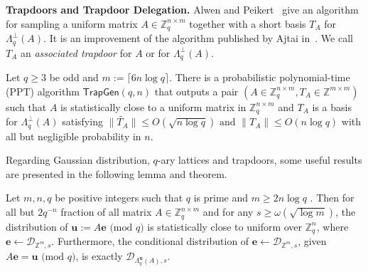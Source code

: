 \documentclass[runningheads]{llncs}
\def\ZZ{\mathbb{Z}}
\def\cal{\mathcal}
\def\bf{\mathbf}
\def\TrapGen{\mathsf{TrapGen}}
\def\L{\Lambda}
\def\Lp{\Lambda^{\perp}}
\begin{document}
\noindent \textbf{Trapdoors and Trapdoor Delegation.}	
Alwen and Peikert~\cite{AP09} give an algorithm for sampling 
a uniform matrix $A\in\ZZ_q^{n\times m}$ together with a  short basis $T_A$ for $\Lp_q(A)$.
It is an improvement of the algorithm published by Ajtai in~\cite{Ajtai99}.
We call $T_A$ an  \textit{associated trapdoor} for $A$ or for $\Lp_q(A)$. 
	\begin{theorem}[\cite{AP09}]\label{thm:TrapGen}
		Let $q\geq 3$ be odd and $m:=\lceil 6n\log q\rceil$. There is a probabilistic polynomial-time (PPT) algorithm $\TrapGen(q,n)$ that outputs a pair $(A\in\ZZ_q^{n\times m},T_A \in\ZZ^{m\times m})$ such that $A$ is statistically close to a uniform matrix in $\ZZ_q^{n\times m}$ and $T_A$ is a basis for $\Lp_q(A)$ satisfying
		$\|\widetilde{T_A}\|\leq O(\sqrt{n\log q})\text{ and }\|T_A\|\leq O(n\log q)$
		with all but negligible probability in $n$.
	\end{theorem}
\noindent
Regarding Gaussian distribution, $q$-ary lattices and trapdoors, 
some useful results are presented in  the following lemma and theorem. 
	\begin{lemma} \label{uniform}
	 Let $m, n, q$ be positive integers such that $q$ is prime and $m \geq 2n \log q$ . Then for all but $2q^{-n}$ fraction of all matrix $A\in \ZZ_q^{n \times m}$ and for any $s\geq \omega(\sqrt{\log m})$, the distribution of $\bf{u}:=A\bf{e} \text{ (mod } q)$ is statistically close to uniform over $\ZZ_q^n$, where $\bf{e} \leftarrow \cal{D}_{\ZZ^m,s}$. Furthermore, the conditional distribution of $\bf{e} \leftarrow \cal{D}_{\ZZ^m,s}$, given $A\bf{e}=\bf{u} \text{ (mod } q)$, is exactly $\cal{D}_{\L_q^{\textbf{u}}(A),s}$.
	\end{lemma}
		
\end{document}
